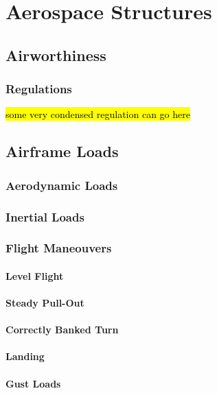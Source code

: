 \chapter{Aerospace Structures}

\newpage
\section{Airworthiness}

\subsection{Regulations}
\hl{some very condensed regulation can go here}





\newpayge
\section{Airframe Loads}
\subsection{Aerodynamic Loads}

\subsection{Inertial Loads}

\subsection{Flight Maneouvers}
\subsubsection{Level Flight}

\subsubsection{Steady Pull-Out}

\subsubsection{Correctly Banked Turn}

\subsubsection{Landing}

\subsubsection{Gust Loads}

